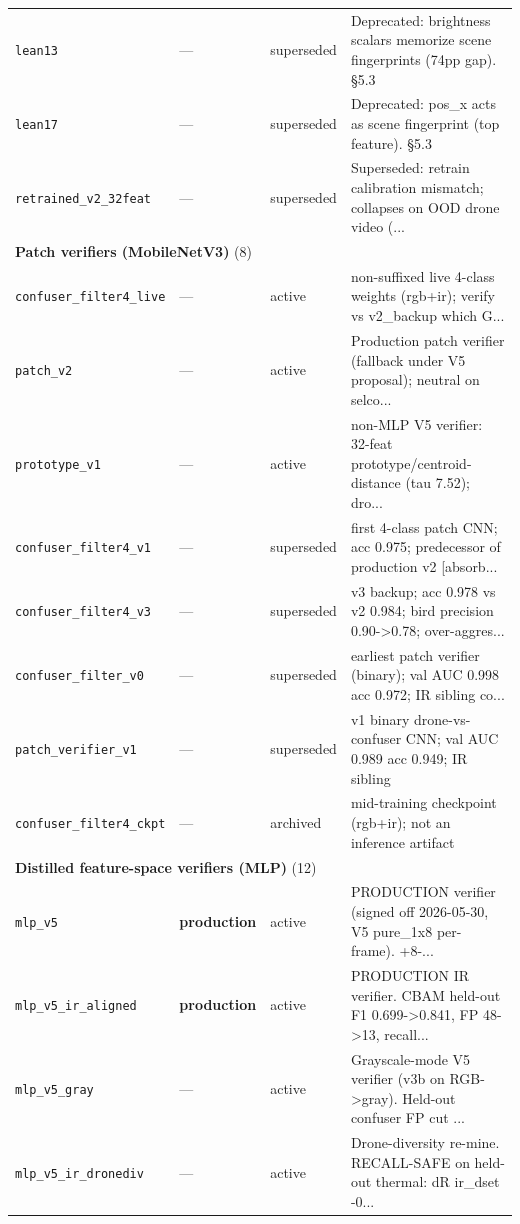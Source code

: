 \begin{longtable}{p{}llp{}}
\texttt{lean13} & --- & superseded & Deprecated: brightness scalars memorize scene fingerprints (74pp gap). §5.3 \\
\texttt{lean17} & --- & superseded & Deprecated: pos\_x acts as scene fingerprint (top feature). §5.3 \\
\texttt{retrained\_v2\_32feat} & --- & superseded & Superseded: retrain calibration mismatch; collapses on OOD drone video (... \\
\midrule
\multicolumn{4}{l}{\textbf{Patch verifiers (MobileNetV3)} (8)} \\
\midrule
\texttt{confuser\_filter4\_live} & --- & active & non-suffixed live 4-class weights (rgb+ir); verify vs v2\_backup which G... \\
\texttt{patch\_v2} & --- & active & Production patch verifier (fallback under V5 proposal); neutral on selco... \\
\texttt{prototype\_v1} & --- & active & non-MLP V5 verifier: 32-feat prototype/centroid-distance (tau 7.52); dro... \\
\texttt{confuser\_filter4\_v1} & --- & superseded & first 4-class patch CNN; acc 0.975; predecessor of production v2 [absorb... \\
\texttt{confuser\_filter4\_v3} & --- & superseded & v3 backup; acc 0.978 vs v2 0.984; bird precision 0.90->0.78; over-aggres... \\
\texttt{confuser\_filter\_v0} & --- & superseded & earliest patch verifier (binary); val AUC 0.998 acc 0.972; IR sibling co... \\
\texttt{patch\_verifier\_v1} & --- & superseded & v1 binary drone-vs-confuser CNN; val AUC 0.989 acc 0.949; IR sibling \\
\texttt{confuser\_filter4\_ckpt} & --- & archived & mid-training checkpoint (rgb+ir); not an inference artifact \\
\midrule
\multicolumn{4}{l}{\textbf{Distilled feature-space verifiers (MLP)} (12)} \\
\midrule
\texttt{mlp\_v5} & \textbf{production} & active & PRODUCTION verifier (signed off 2026-05-30, V5 pure\_1x8 per-frame). +8-... \\
\texttt{mlp\_v5\_ir\_aligned} & \textbf{production} & active & PRODUCTION IR verifier. CBAM held-out F1 0.699->0.841, FP 48->13, recall... \\
\texttt{mlp\_v5\_gray} & --- & active & Grayscale-mode V5 verifier (v3b on RGB->gray). Held-out confuser FP cut ... \\
\texttt{mlp\_v5\_ir\_dronediv} & --- & active & Drone-diversity re-mine. RECALL-SAFE on held-out thermal: dR ir\_dset -0... \\

\end{longtable}
